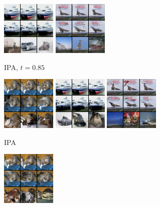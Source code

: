 \begin{figure}[t]
\begin{subfigure}[t]{0.17\textwidth}
      \includegraphics[height=\cifarimgheight]{figs/cigcvae/image-samples/cifar10/freeform_aipo_1_t=0.85_samples}
      \includegraphics[height=\cifarimgheight]{figs/cigcvae/image-samples/cifar10/freeform_aipo_3_t=0.85_samples}
      \caption{IPA, $t=0.85$}
    \end{subfigure}
    \begin{subfigure}[t]{0.17\textwidth}
      \centering
      \includegraphics[height=\cifarimgheight]{figs/cigcvae/image-samples/cifar10/freeform_aipo_0_samples}
      \includegraphics[height=\cifarimgheight]{figs/cigcvae/image-samples/cifar10/freeform_aipo_1_samples}
      \includegraphics[height=\cifarimgheight]{figs/cigcvae/image-samples/cifar10/freeform_aipo_3_samples}
      \caption{IPA}
    \end{subfigure}
    \begin{subfigure}[t]{0.17\textwidth}
      \centering
      \includegraphics[height=\cifarimgheight]{figs/cigcvae/image-samples/cifar10/freeform_aipo_0_imagenet_samples}

\end{subfigure}
\end{figure}
